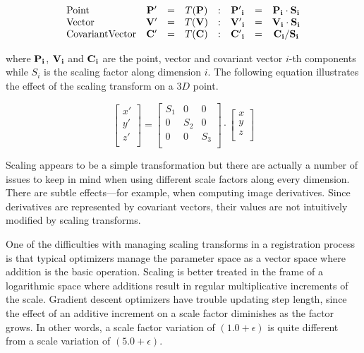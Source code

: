 \begin{equation}
\begin{array}{lccccccc}
\mbox{Point }          & \bf{P'} &  =  & T(\bf{P})  & : & \bf{P'}_i &  = & \bf{P}_i \cdot S_i \\
\mbox{Vector}          & \bf{V'} &  =  & T(\bf{V})  & : & \bf{V'}_i &  = & \bf{V}_i \cdot S_i \\
\mbox{CovariantVector} & \bf{C'} &  =  & T(\bf{C})  & : & \bf{C'}_i &  = & \bf{C}_i /     S_i \\
\end{array}
\end{equation}

where $\bf{P}_i$, $\bf{V}_i$ and $\bf{C}_i$ are the point, vector and covariant
vector $i$-th components while $S_i$ is the scaling factor along dimension $i$.
The following equation illustrates the effect of the scaling transform on a
$3D$ point.

\begin{equation}
\left[ 
\begin{array}{c}
x' \\
y' \\
z' \\
\end{array}
\right]
=
\left[ 
\begin{array}{ccc}
S_1 &  0  &  0  \\
 0  & S_2 &  0  \\
 0  &  0  & S_3 \\
\end{array}
\right]
\cdot
\left[ 
\begin{array}{c}
x  \\
y  \\
z  \\
\end{array}
\right]
\end{equation}

Scaling appears to be a simple transformation but there are actually a
number of issues to keep in mind when using different scale factors along
every dimension. There are subtle effects---for example, when computing image
derivatives. Since derivatives are represented by covariant vectors, their
values are not intuitively modified by scaling transforms.

One of the difficulties with managing scaling transforms in a registration
process is that typical optimizers manage the parameter space as a vector
space where addition is the basic operation. Scaling is better treated in the
frame of a logarithmic space where additions result in regular multiplicative
increments of the scale. Gradient descent optimizers have trouble updating
step length, since the effect of an additive increment on a scale factor
diminishes as the factor grows. In other words, a scale factor variation of
$(1.0+ \epsilon)$ is quite different from a scale variation of
$(5.0+\epsilon)$.


